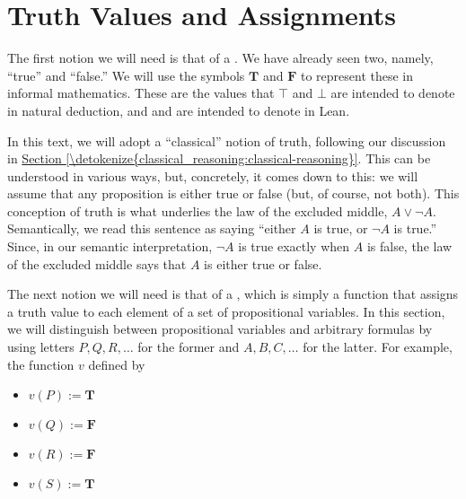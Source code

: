 \documentclass[letterpaper,10pt,english]{sphinxmanual}
\begin{document}
\section{Truth Values and Assignments}
\label{\detokenize{semantics_of_propositional_logic:truth-values-and-assignments}}
\sphinxAtStartPar
The first notion we will need is that of a . We have already seen two, namely, “true” and “false.” We will use the symbols \(\mathbf{T}\) and \(\mathbf{F}\) to represent these in informal mathematics. These are the values that \(\top\) and \(\bot\) are intended to denote in natural deduction, and  and  are intended to denote in Lean.

\sphinxAtStartPar
In this text, we will adopt a “classical” notion of truth, following our discussion in \hyperref[\detokenize{classical_reasoning:classical-reasoning}]{Section \ref{\detokenize{classical_reasoning:classical-reasoning}}}. This can be understood in various ways, but, concretely, it comes down to this: we will assume that any proposition is either true or false (but, of course, not both). This conception of truth is what underlies the law of the excluded middle, \(A \vee \neg A\). Semantically, we read this sentence as saying “either \(A\) is true, or \(\neg A\) is true.” Since, in our semantic interpretation, \(\neg A\) is true exactly when \(A\) is false, the law of the excluded middle says that \(A\) is either true or false.

\sphinxAtStartPar
The next notion we will need is that of a , which is simply a function that assigns a truth value to each element of a set of propositional variables. In this section, we will distinguish between propositional variables and arbitrary formulas by using letters \(P, Q, R, \ldots\) for the former and \(A, B, C, \ldots\) for the latter. For example, the function \(v\) defined by
\begin{itemize}
\item {} 
\sphinxAtStartPar
\(v(P) := \mathbf{T}\)

\item {} 
\sphinxAtStartPar
\(v(Q) := \mathbf{F}\)

\item {} 
\sphinxAtStartPar
\(v(R) := \mathbf{F}\)

\item {} 
\sphinxAtStartPar
\(v(S) := \mathbf{T}\)

\end{itemize}
\end{document}
